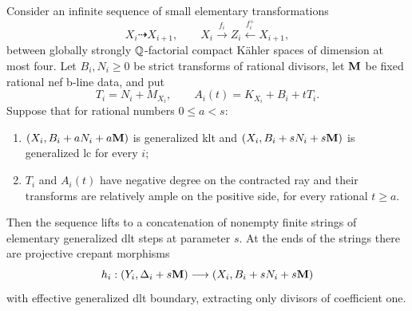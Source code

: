 \begin{lemma}\label{lem:threshold-lift}
Consider an infinite sequence of small elementary transformations
\[
 X_i\dashrightarrow X_{i+1},\qquad
 X_i\xrightarrow{f_i}Z_i\xleftarrow{f_i^+}X_{i+1},
\]
between globally strongly $\mathbb Q$-factorial compact K\"ahler spaces of
dimension at most four.  Let
$B_i,N_i\geq0$ be strict transforms of rational divisors, let $\mathbf M$ be
fixed rational nef b-line data, and put
\[
 T_i=N_i+M_{X_i},\qquad A_i(t)=K_{X_i}+B_i+tT_i.
\]
Suppose that for rational numbers $0\leq a<s$:
\begin{enumerate}[label=\textup{(\roman*)}]
 \item $(X_i,B_i+aN_i+a\mathbf M)$ is generalized klt and
       $(X_i,B_i+sN_i+s\mathbf M)$ is generalized lc for every $i$;
 \item $T_i$ and $A_i(t)$ have negative degree on the contracted ray
       and their transforms are relatively ample on the positive side,
       for every rational $t\geq a$.
\end{enumerate}
Then the sequence lifts to a concatenation of nonempty finite strings of
elementary generalized dlt steps at parameter $s$.  At the ends of the
strings there are projective crepant morphisms
\[
 h_i:(Y_i,\Delta_i+s\mathbf M)\longrightarrow
       (X_i,B_i+sN_i+s\mathbf M)
\]
with effective generalized dlt boundary, extracting only divisors of
coefficient one.
\end{lemma}


